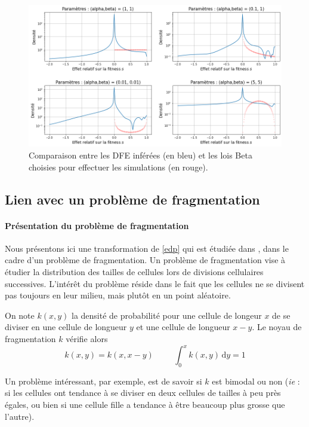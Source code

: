 \documentclass[12pt]{article}
\newcommand{\esp}{\hspace{1cm}}
\newcommand{\ie}{\emph{ie} }
\newcommand{\de}{\,\mathrm{d}}
\begin{document}
\begin{figure}[h]
  \begin{center}
    \includegraphics[width=0.9\linewidth]{../Img/DFE_inferred.png}
  \end{center}
  \caption{\label{fig:DFE}Comparaison entre les DFE inférées (en bleu) et les lois Beta choisies pour effectuer les simulations (en rouge).}
\end{figure}



\subsection{Lien avec un problème de fragmentation}

\paragraph{Présentation du problème de fragmentation}
Nous présentons ici une transformation de \eqref{edp} qui est étudiée dans \cite{md1}, \cite{md2} dans le cadre d'un problème de fragmentation. Un problème de fragmentation vise à étudier la distribution des tailles de cellules lors de divisions cellulaires successives. L'intérêt du problème réside dans le fait que les cellules ne se divisent pas toujours en leur milieu, mais plutôt en un point aléatoire.

On note $k(x,y)$ la densité de probabilité pour une cellule de longeur $x$ de se diviser en une cellule de longueur $y$ et une cellule de longueur $x-y$. Le noyau de fragmentation $k$ vérifie alors \[k(x,y)=k(x,x-y)\esp \int_0^xk(x,y)\de y=1\]

Un problème intéressant, par exemple, est de savoir si $k$ est bimodal ou non (\ie: si les cellules ont tendance à se diviser en deux cellules de tailles à peu près égales, ou bien si une cellule fille a tendance à être beaucoup plus grosse que l'autre).
\end{document}

